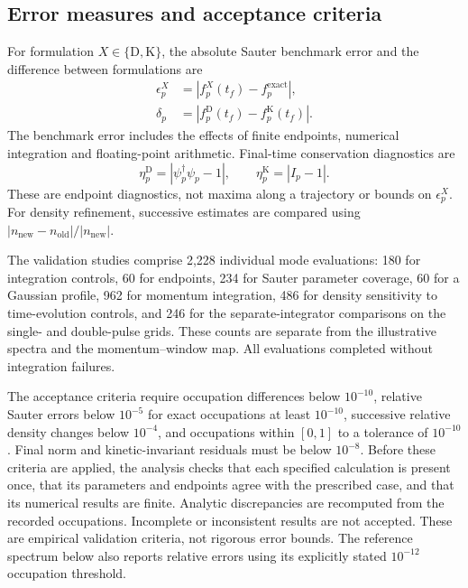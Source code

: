 \documentclass[11pt,a4paper]{article}
\begin{document}
\subsection{Error measures and acceptance criteria}

For formulation $X\in\{\mathrm D,\mathrm K\}$, the absolute Sauter benchmark error and the difference between formulations are
\begin{align}
  \epsilon_p^X&=\left|f_p^X(t_f)-f_p^{\mathrm{exact}}\right|,\nonumber\\
  \delta_p&=\left|f_p^{\mathrm D}(t_f)-f_p^{\mathrm K}(t_f)\right|.
  \label{eq:errors}
\end{align}
The benchmark error includes the effects of finite endpoints, numerical integration and floating-point arithmetic. Final-time conservation diagnostics are
\begin{equation}
  \eta_p^{\mathrm D}=|\psi_p^\dagger\psi_p-1|,\qquad
  \eta_p^{\mathrm K}=|I_p-1|.
  \label{eq:diagnostics}
\end{equation}
These are endpoint diagnostics, not maxima along a trajectory or bounds on $\epsilon_p^X$. For density refinement, successive estimates are compared using $|n_{\mathrm{new}}-n_{\mathrm{old}}|/|n_{\mathrm{new}}|$.

The validation studies comprise 2,228 individual mode evaluations: 180 for integration controls, 60 for endpoints, 234 for Sauter parameter coverage, 60 for a Gaussian profile, 962 for momentum integration, 486 for density sensitivity to time-evolution controls, and 246 for the separate-integrator comparisons on the single- and double-pulse grids. These counts are separate from the illustrative spectra and the momentum--window map. All evaluations completed without integration failures.

The acceptance criteria require occupation differences below $10^{-10}$, relative Sauter errors below $10^{-5}$ for exact occupations at least $10^{-10}$, successive relative density changes below $10^{-4}$, and occupations within $[0,1]$ to a tolerance of $10^{-10}$. Final norm and kinetic-invariant residuals must be below $10^{-8}$. Before these criteria are applied, the analysis checks that each specified calculation is present once, that its parameters and endpoints agree with the prescribed case, and that its numerical results are finite. Analytic discrepancies are recomputed from the recorded occupations. Incomplete or inconsistent results are not accepted. These are empirical validation criteria, not rigorous error bounds. The reference spectrum below also reports relative errors using its explicitly stated $10^{-12}$ occupation threshold.
\end{document}
